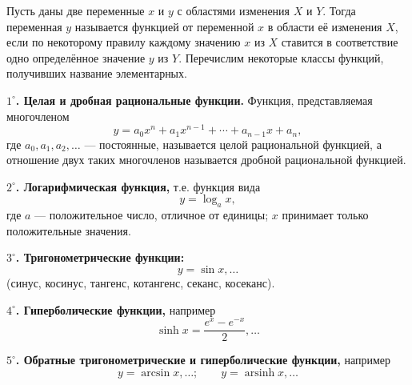 \begin{rusblock}
Пусть даны две переменные $x$ и $y$ с областями изменения $X$ и $Y$. Тогда переменная $y$ называется функцией от переменной $x$ в области её изменения $X$, если по некоторому правилу каждому значению $x$ из $X$ ставится в соответствие одно определённое значение $y$ из $Y$. Перечислим некоторые классы функций, получивших название элементарных.

\textbf{$1^\circ$. Целая и дробная рациональные функции.} Функция, представляемая многочленом
\[
y=a_0x^n+a_1x^{n-1}+\cdots+a_{n-1}x+a_n,
\]
где $a_0,a_1,a_2,\ldots$ --- постоянные, называется целой рациональной функцией, а отношение двух таких многочленов называется дробной рациональной функцией.

\textbf{$2^\circ$. Логарифмическая функция,} т.е. функция вида
\[
y=\log_a x,
\]
где $a$ --- положительное число, отличное от единицы; $x$ принимает только положительные значения.

\textbf{$3^\circ$. Тригонометрические функции:}
\[
y=\sin x,\ldots
\]
(синус, косинус, тангенс, котангенс, секанс, косеканс).

\textbf{$4^\circ$. Гиперболические функции,} например
\[
\sinh x=\frac{e^x-e^{-x}}{2},\ldots
\]

\textbf{$5^\circ$. Обратные тригонометрические и гиперболические функции,} например
\[
y=\arcsin x,\ldots;\qquad y=\operatorname{arsinh}x,\ldots
\]
\end{rusblock}

